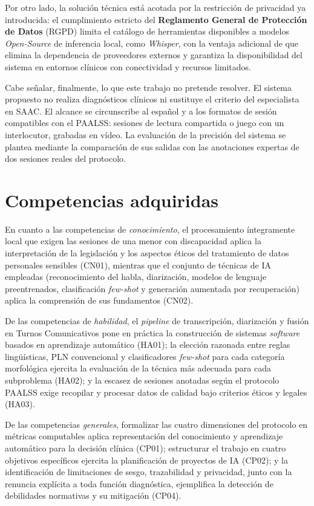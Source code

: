 Por otro lado, la solución técnica está acotada por la restricción de
privacidad ya introducida: el cumplimiento estricto del \textbf{Reglamento
General de Protección de Datos} (RGPD) limita el catálogo de herramientas
disponibles a modelos \emph{Open-Source} de inferencia local, como
\emph{Whisper}, con la ventaja adicional de que elimina la dependencia de 
proveedores externos y garantiza la disponibilidad del sistema
en entornos clínicos con conectividad y recursos limitados.

Cabe señalar, finalmente, lo que este trabajo no pretende resolver. El sistema
propuesto no realiza diagnósticos clínicos ni sustituye el criterio del
especialista en \ac{SAAC}. El alcance se circunscribe al español y a los formatos 
de sesión compatibles con el \ac{PAALSS}: sesiones de lectura compartida o juego 
con un interlocutor, grabadas en vídeo. La evaluación de la precisión del sistema se 
plantea mediante la comparación de sus salidas con las anotaciones expertas de dos sesiones 
reales del protocolo\cite{soto2024paalss_pilot}.

\section{Competencias adquiridas}

En cuanto a las competencias de \emph{conocimiento}, el procesamiento íntegramente
local que exigen las sesiones de una menor con discapacidad aplica la interpretación
de la legislación y los aspectos éticos del tratamiento de datos personales sensibles
(CN01), mientras que el conjunto de técnicas de \ac{IA} empleadas (reconocimiento del
habla, diarización, modelos de lenguaje preentrenados, clasificación \emph{few-shot} y
generación aumentada por recuperación) aplica la comprensión de sus fundamentos (CN02).

De las competencias de \emph{habilidad}, el \emph{pipeline} de transcripción,
diarización y fusión en Turnos Comunicativos pone en práctica la construcción de
sistemas \emph{software} basados en aprendizaje automático (HA01); la elección razonada
entre reglas lingüísticas, \ac{PLN} convencional y clasificadores \emph{few-shot} para
cada categoría morfológica ejercita la evaluación de la técnica más adecuada para cada
subproblema (HA02); y la escasez de sesiones anotadas según el protocolo \ac{PAALSS}
exige recopilar y procesar datos de calidad bajo criterios éticos y legales (HA03).

De las competencias \emph{generales}, formalizar las cuatro dimensiones del protocolo en
métricas computables aplica representación del conocimiento y aprendizaje automático
para la decisión clínica (CP01); estructurar el trabajo en cuatro objetivos específicos
ejercita la planificación de proyectos de \ac{IA} (CP02); y la identificación de
limitaciones de sesgo, trazabilidad y privacidad, junto con la renuncia explícita a toda
función diagnóstica, ejemplifica la detección de debilidades normativas y su mitigación
(CP04).


